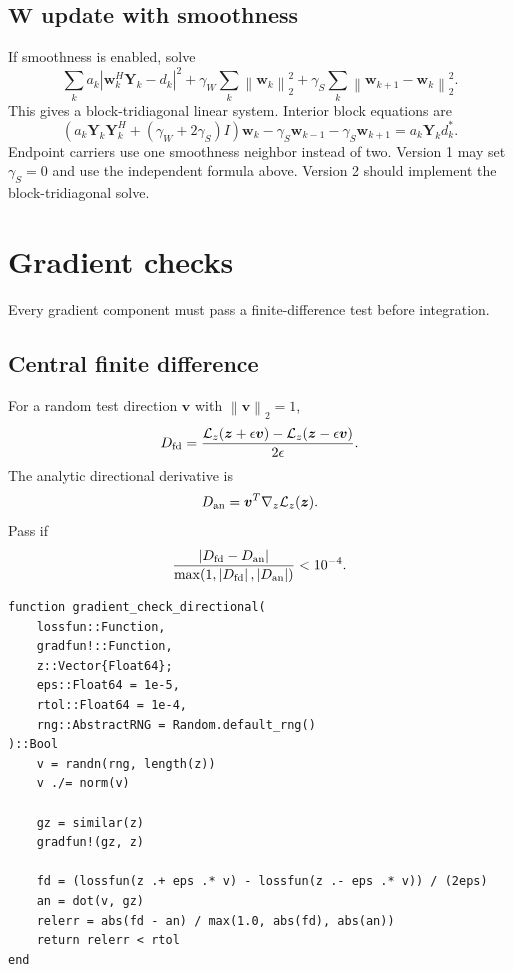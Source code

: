\documentclass[11pt]{article}
\newcommand{\norm}[1]{\left\lVert #1 \right\rVert}
\newcommand{\abs}[1]{\left\lvert #1 \right\rvert}
\begin{document}
\subsection{$\mathbf W$ update with smoothness}

If smoothness is enabled, solve
\begin{equation}
\sum_k a_k\abs{\mathbf w_k^H\mathbf Y_k-d_k}^2
+\gamma_W\sum_k\norm{\mathbf w_k}_2^2
+\gamma_S\sum_k\norm{\mathbf w_{k+1}-\mathbf w_k}_2^2.
\end{equation}
This gives a block-tridiagonal linear system.  Interior block equations are
\begin{equation}
\left(a_k\mathbf Y_k\mathbf Y_k^H+(\gamma_W+2\gamma_S)I\right)\mathbf w_k
-\gamma_S\mathbf w_{k-1}
-\gamma_S\mathbf w_{k+1}
=a_k\mathbf Y_k d_k^*.
\end{equation}
Endpoint carriers use one smoothness neighbor instead of two.  Version 1 may set $\gamma_S=0$ and use the independent formula above.  Version 2 should implement the block-tridiagonal solve.

\section{Gradient checks}
\label{sec:checks}

Every gradient component must pass a finite-difference test before integration.

\subsection{Central finite difference}

For a random test direction $\bm v$ with $\norm{\bm v}_2=1$,
\begin{equation}
D_{\rm fd}=\frac{\mathcal L_z(\bm z+\epsilon\bm v)-\mathcal L_z(\bm z-\epsilon\bm v)}{2\epsilon}.
\end{equation}
The analytic directional derivative is
\begin{equation}
D_{\rm an}=\bm v^T\nabla_z\mathcal L_z(\bm z).
\end{equation}
Pass if
\begin{equation}
\frac{\abs{D_{\rm fd}-D_{\rm an}}}{\max(1,\abs{D_{\rm fd}},\abs{D_{\rm an}})}<10^{-4}.
\end{equation}

\begin{lstlisting}
function gradient_check_directional(
    lossfun::Function,
    gradfun!::Function,
    z::Vector{Float64};
    eps::Float64 = 1e-5,
    rtol::Float64 = 1e-4,
    rng::AbstractRNG = Random.default_rng()
)::Bool
    v = randn(rng, length(z))
    v ./= norm(v)

    gz = similar(z)
    gradfun!(gz, z)

    fd = (lossfun(z .+ eps .* v) - lossfun(z .- eps .* v)) / (2eps)
    an = dot(v, gz)
    relerr = abs(fd - an) / max(1.0, abs(fd), abs(an))
    return relerr < rtol
end
\end{lstlisting}
\end{document}
